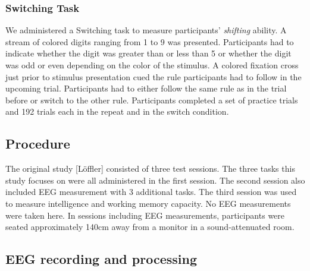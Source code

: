 \documentclass[
  man,floatsintext]{apa7}
\begin{document}
\hypertarget{switching-task}{%
\subsubsection{Switching Task}\label{switching-task}}

We administered a Switching task to measure participants' \emph{shifting} ability. A stream of colored digits ranging from 1 to 9 was presented. Participants had to indicate whether the digit was greater than or less than 5 or whether the digit was odd or even depending on the color of the stimulus. A colored fixation cross just prior to stimulus presentation cued the rule participants had to follow in the upcoming trial. Participants had to either follow the same rule as in the trial before or switch to the other rule. Participants completed a set of practice trials and 192 trials each in the repeat and in the switch condition.

\hypertarget{procedure}{%
\subsection{Procedure}\label{procedure}}

The original study {[}Löffler{]} consisted of three test sessions. The three tasks this study focuses on were all administered in the first session. The second session also included EEG measurement with 3 additional tasks. The third session was used to measure intelligence and working memory capacity. No EEG measurements were taken here. In sessions including EEG measurements, participants were seated approximately 140cm away from a monitor in a sound-attenuated room.

\hypertarget{eeg-recording-and-processing}{%
\subsection{EEG recording and processing}\label{eeg-recording-and-processing}}
\end{document}

